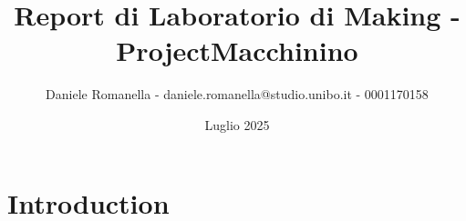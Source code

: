 \documentclass{article}
\title{Report di Laboratorio di Making - ProjectMacchinino}
\author{Daniele Romanella - daniele.romanella@studio.unibo.it - 0001170158}
\date{Luglio 2025}
\begin{document}
\maketitle

\section{Introduction}
\end{document}
